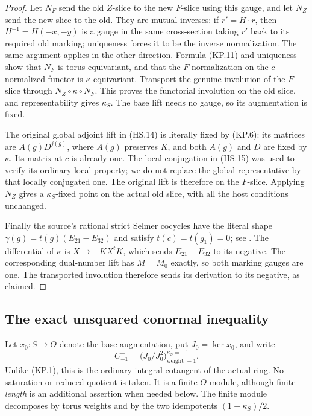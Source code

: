 \documentclass[11pt,a4paper]{article}
\theoremstyle{definition}
\begin{document}
\begin{proof}
Let $N_F$ send the old $Z$-slice to the new $F$-slice using
this gauge, and let $N_Z$ send the new slice to the old.
They are mutual inverses: if $r'=H\cdot r$, then
$H^{-1}=H(-x,-y)$ is a gauge in the same cross-section taking
$r'$ back to its required old marking; uniqueness forces it
to be the inverse normalization.  The same argument applies
in the other direction.  Formula (KP.11) and uniqueness show
that $N_F$ is torus-equivariant, and that the $F$-normalization
on the $c$-normalized functor is $\kappa$-equivariant.
Transport the genuine involution of the $F$-slice through
$N_Z\circ\kappa\circ N_F$.  This proves the functorial
involution on the old slice, and representability gives
$\kappa_S$.  The base lift needs no gauge, so its augmentation
is fixed.

The original global adjoint lift in (HS.14) is literally fixed by
(KP.6): its matrices are $A(g)D^{j(g)}$, where $A(g)$
preserves $K$, and both $A(g)$ and $D$ are fixed by $\kappa$.
Its matrix at $c$ is already one.  The local conjugation in
(HS.15) was used to verify its ordinary local property;
we do not replace the global representative by that locally
conjugated one.  The original lift is therefore on the
$F$-slice.  Applying $N_Z$ gives a $\kappa_S$-fixed point on
the actual old slice, with all the host conditions unchanged.

Finally the source's rational strict Selmer cocycles have
the literal shape $\gamma(g)=t(g)(E_{21}-E_{32})$ and satisfy
$t(c)=t(g_1)=0$; see
.
The differential of $\kappa$ is $X\mapsto-KX^tK$, which sends
$E_{21}-E_{32}$ to its negative.  The corresponding
dual-number lift has $M=M_0$ exactly, so both marking gauges
are one.  The transported involution therefore sends its
derivation to its negative, as claimed.
\end{proof}

\subsection{The exact unsquared conormal inequality}

Let $x_0:S\to O$ denote the base augmentation, put
$J_0=\ker x_0$, and write
\[
       C^-_{-1}=\bigl(J_0/J_0^2\bigr)_{\text{weight }-1}^{\kappa_S=-1}.
                                                                  \tag{KP.13}
\]
Unlike (KP.1), this is the ordinary integral cotangent of the
actual ring.  No saturation or reduced quotient is taken.
It is a finite $O$-module, although finite \emph{length} is an
additional assertion when needed below.  The finite module
decomposes by torus weights and by the two idempotents
$(1\pm\kappa_S)/2$.
\end{document}
